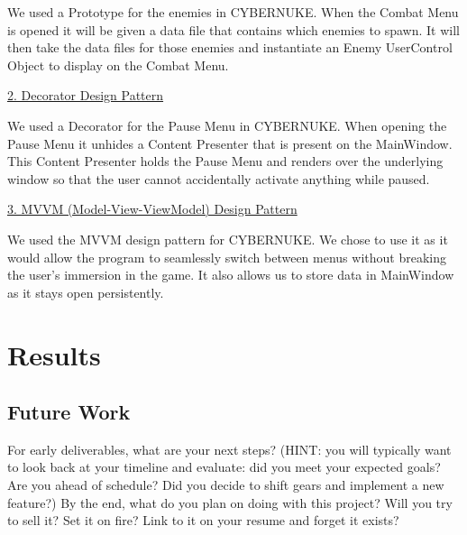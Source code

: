 \documentclass[10pt,conference,onecolumn,compsoc]{IEEEtran}
\begin{document}
We used a Prototype for the enemies in CYBERNUKE. When the Combat Menu is opened it will be given a data file that contains which enemies to spawn. It will then take the data files for those enemies and instantiate an Enemy UserControl Object to display on the Combat Menu.

\underline{2. Decorator Design Pattern}
\vspace{5px}

We used a Decorator for the Pause Menu in CYBERNUKE. When opening the Pause Menu it unhides a Content Presenter that is present on the MainWindow. This Content Presenter holds the Pause Menu and renders over the underlying window so that the user cannot accidentally activate anything while paused.

\underline{3. MVVM (Model-View-ViewModel) Design Pattern}
\vspace{5px}

We used the MVVM design pattern for CYBERNUKE. We chose to use it as it would allow the program to seamlessly switch between menus without breaking the user's immersion in the game. It also allows us to store data in MainWindow as it stays open persistently.


\section{Results}

\subsection{Future Work}
For early deliverables, what are your next steps?  (HINT: you will typically want to look back at your timeline and evaluate: did you meet your expected goals?  Are you ahead of schedule?  Did you decide to shift gears and implement a new feature?)
By the end, what do you plan on doing with this project?  Will you try to sell it?  Set it on fire?  Link to it on your resume and forget it exists?




\end{document}
